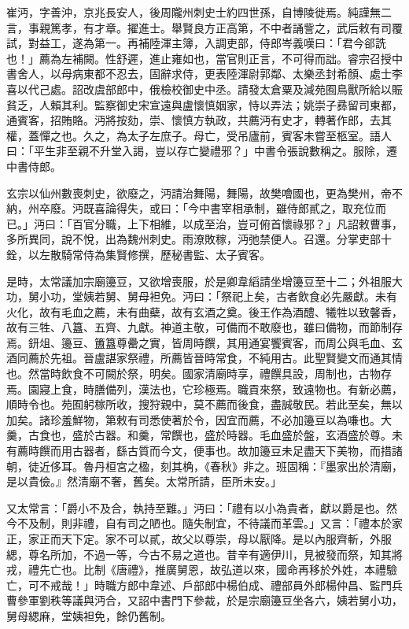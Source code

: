 \begin{pinyinscope}
 崔沔，字善沖，京兆長安人，後周隴州刺史士約四世孫，自博陵徙焉。純謹無二言，事親篤孝，有才章。擢進士。舉賢良方正高第，不中者誦訾之，武后敕有司覆試，對益工，遂為第一。再補陸渾主簿，入調吏部，侍郎岑義嘆曰：「君今郤詵也！」薦為左補闕。性舒遲，進止雍如也，當官則正言，不可得而詘。睿宗召授中書舍人，以母病東都不忍去，固辭求侍，更表陸渾尉郭鄰、太樂丞封希顏、處士李喜以代己處。詔改虞部郎中，俄檢校御史中丞。請發太倉粟及減苑囿鳥獸所給以賑貧乏，人賴其利。監察御史宋宣遠與盧懷慎姻家，恃以弄法；姚崇子彞留司東都，通賓客，招賄賂。沔將按劾，崇、懷慎方執政，共薦沔有史才，轉著作郎，去其權，蓋憚之也。久之，為太子左庶子。母亡，受吊廬前，賓客未嘗至柩室。語人曰：「平生非至親不升堂入謁，豈以存亡變禮邪？」中書令張說數稱之。服除，遷中書侍郎。



 玄宗以仙州數喪刺史，欲廢之，沔請治舞陽，舞陽，故樊噲國也，更為樊州，帝不納，州卒廢。沔既喜論得失，或曰：「今中書宰相承制，雖侍郎貳之，取充位而已。」沔曰：「百官分職，上下相維，以成至治，豈可俯首懷祿邪？」凡詔敕曹事，多所異同，說不悅，出為魏州刺史。雨潦敗稼，沔弛禁便人。召還。分掌吏部十銓，以左散騎常侍為集賢修撰，歷秘書監、太子賓客。



 是時，太常議加宗廟籩豆，又欲增喪服，於是卿韋縚請坐增籩豆至十二；外祖服大功，舅小功，堂姨若舅、舅母袒免。沔曰：「祭祀上矣，古者飲食必先嚴獻。未有火化，故有毛血之薦，未有曲蘗，故有玄酒之奠。後王作為酒醴、犧牲以致馨香，故有三牲、八簋、五齊、九獻。神道主敬，可備而不敢廢也，雖曰備物，而節制存焉。鈃俎、籩豆、簠簋尊罍之實，皆周時饌，其用通宴饗賓客，而周公與毛血、玄酒同薦於先祖。晉盧諶家祭禮，所薦皆晉時常食，不純用古。此聖賢變文而通其情也。然當時飲食不可闕於祭，明矣。國家清廟時享，禮饌具設，周制也，古物存焉。園寢上食，時膳備列，漢法也，它珍極焉。職貢來祭，致遠物也。有新必薦，順時令也。苑囿躬稼所收，搜狩親中，莫不薦而後食，盡誠敬民。若此至矣，無以加矣。諸珍羞鮮物，第敕有司悉使著於令，因宜而薦，不必加籩豆以為嗛也。大羹，古食也，盛於古器。和羹，常饌也，盛於時器。毛血盛於盤，玄酒盛於尊。未有薦時饌而用古器者，繇古質而今文，便事也。故加籩豆未足盡天下美物，而措諸朝，徒近侈耳。魯丹桓宮之楹，刻其桷，《春秋》非之。班固稱：『墨家出於清廟，是以貴儉。』然清廟不奢，舊矣。太常所請，臣所未安。」



 又太常言：「爵小不及合，執持至難。」沔曰：「禮有以小為貴者，獻以爵是也。然今不及制，則非禮，自有司之陋也。隨失制宜，不待議而革雲。」又言：「禮本於家正，家正而天下定。家不可以貳，故父以尊崇，母以厭降。是以內服齊斬，外服緦，尊名所加，不過一等，今古不易之道也。昔辛有適伊川，見被發而祭，知其將戎，禮先亡也。比制《唐禮》，推廣舅恩，故弘道以來，國命再移於外姓，本禮驗亡，可不戒哉！」時職方郎中韋述、戶部郎中楊伯成、禮部員外郎楊仲昌、監門兵曹參軍劉秩等議與沔合，又詔中書門下參裁，於是宗廟籩豆坐各六，姨若舅小功，舅母緦麻，堂姨袒免，餘仍舊制。




\end{pinyinscope}
